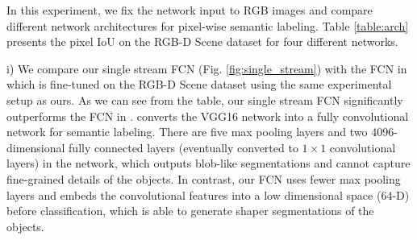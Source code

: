 \documentclass[conference]{IEEEtran}
\begin{document}
\begin{table} 
\end{table}

In this experiment, we fix the network input to RGB images and compare different network architectures for pixel-wise semantic labeling. Table \ref{table:arch} presents the pixel IoU on the RGB-D Scene dataset for four different networks. 

i) We compare our single stream FCN (Fig. \ref{fig:single_stream}) with the FCN in \cite{long2015fully} which is fine-tuned on the RGB-D Scene dataset using the same experimental setup as ours. As we can see from the table, our single stream FCN significantly outperforms the FCN in \cite{long2015fully}. \cite{long2015fully} converts the VGG16 network into a fully convolutional network for semantic labeling. There are five max pooling layers and two 4096-dimensional fully connected layers (eventually converted to $1 \times 1$ convolutional layers) in the network, which outputs blob-like segmentations and cannot capture fine-grained details of the objects. In contrast, our FCN uses fewer max pooling layers and embeds the convolutional features into a low dimensional space (64-D) before classification, which is able to generate shaper segmentations of the objects.
\end{document}
